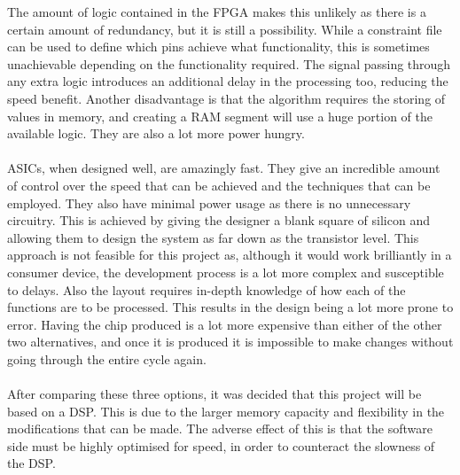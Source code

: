 The amount of logic contained in the FPGA makes this unlikely as there is a certain amount of redundancy, but it is still a possibility.
While a constraint file can be used to define which pins achieve what functionality, this is sometimes unachievable depending on the functionality required.
The signal passing through any extra logic introduces an additional delay in the processing too, reducing the speed benefit.
Another disadvantage is that the algorithm requires the storing of values in memory, and creating a RAM segment will use a huge portion of the available logic.
They are also a lot more power hungry.
\\
\\
ASICs, when designed well, are amazingly fast.
They give an incredible amount of control over the speed that can be achieved and the techniques that can be employed.
They also have minimal power usage as there is no unnecessary circuitry.
This is achieved by giving the designer a blank square of silicon and allowing them to design the system as far down as the transistor level.
This approach is not feasible for this project as, although it would work brilliantly in a consumer device, the development process is a lot more complex and susceptible to delays.
Also the layout requires in-depth knowledge of how each of the functions are to be processed.
This results in the design being a lot more prone to error.
Having the chip produced is a lot more expensive than either of the other two alternatives, and once it is produced it is impossible to make changes without going through the entire cycle again.
\\
\\
After comparing these three options, it was decided that this project will be based on a DSP.
This is due to the larger memory capacity and flexibility in the modifications that can be made.
The adverse effect of this is that the software side must be highly optimised for speed, in order to counteract the slowness of the DSP. 
